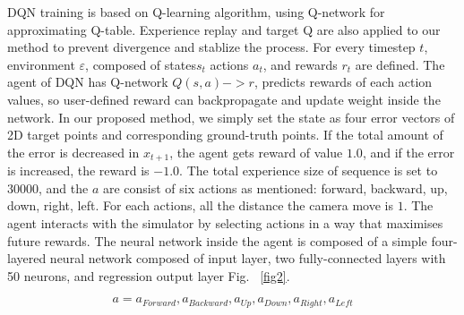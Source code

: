 \documentclass[10pt]{article}
\begin{document}
DQN training is based on Q-learning\cite{ref1} algorithm, using Q-network for approximating Q-table. Experience replay and target Q are also applied to our method to prevent divergence and  stablize the process. For every timestep $t$, environment $\varepsilon$, composed of states$s_t$ actions $a_t$, and rewards $r_t$ are defined. The agent of DQN has Q-network $Q(s, a) -> r$, predicts rewards of each action values, so user-defined reward can backpropagate and update weight inside the network\cite{ref2}. In our proposed method, we simply set the state as four error vectors of 2D target points and corresponding ground-truth points. If the total amount of the error is decreased in $x_{t+1}$, the agent gets reward of value $1.0$, and if the error is increased, the reward is $-1.0$. The total experience size of sequence is set to $30000$, and the $a$ are consist of six actions as mentioned: forward, backward, up, down, right, left. For each actions, all the distance the camera move is $1$. The agent interacts with the simulator by selecting actions in a way that maximises future rewards. The neural network inside the agent is composed of a simple four-layered neural network composed of input layer, two fully-connected layers with 50 neurons, and regression output layer Fig. ~\ref{fig2}.

\begin{equation}\label{actions}
  a = {a_{Forward}, a_{Backward}, a_{Up}, a_{Down}, a_{Right}, a_{Left}}
\end{equation}
\end{document}
